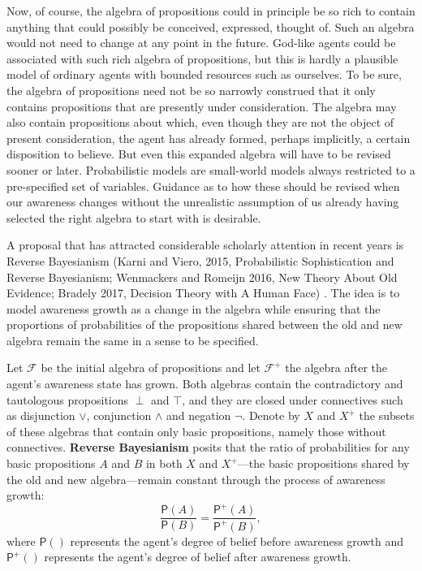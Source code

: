 \documentclass[
  11pt,
  dvipsnames,enabledeprecatedfontcommands]{scrartcl}
\newcommand{\pr}[1]{\ensuremath{\mathsf{P}(#1)}}
\newcommand{\ppr}[2]{\ensuremath{\mathsf{P}^{#1}(#2)}}
\begin{document}
Now, of course, the algebra of propositions could in principle be so
rich to contain anything that could possibly be conceived, expressed,
thought of. Such an algebra would not need to change at any point in the
future. God-like agents could be associated with such rich algebra of
propositions, but this is hardly a plausible model of ordinary agents
with bounded resources such as ourselves. To be sure, the algebra of
propositions need not be so narrowly construed that it only contains
propositions that are presently under consideration. The algebra may
also contain propositions about which, even though they are not the
object of present consideration, the agent has already formed, perhaps
implicitly, a certain disposition to believe. But even this expanded
algebra will have to be revised sooner or later. Probabilistic models
are small-world models always restricted to a pre-specified set of
variables. Guidance as to how these should be revised when our awareness
changes without the unrealistic assumption of us already having selected
the right algebra to start with is desirable.

A proposal that has attracted considerable scholarly attention in recent
years is Reverse Bayesianism (Karni and Viero, 2015, Probabilistic
Sophistication and Reverse Bayesianism; Wenmackers and Romeijn 2016, New
Theory About Old Evidence; Bradely 2017, Decision Theory with A Human
Face) . The idea is to model awareness growth as a change in the algebra
while ensuring that the proportions of probabilities of the propositions
shared between the old and new algebra remain the same in a sense to be
specified.

Let \(\mathcal{F}\) be the initial algebra of propositions and let
\(\mathcal{F}^+\) the algebra after the agent's awareness state has
grown. Both algebras contain the contradictory and tautologous
propositions \(\perp\) and \(\top\), and they are closed under
connectives such as disjunction \(\vee\), conjunction \(\wedge\) and
negation \(\neg\). Denote by \(X\) and \(X^+\) the subsets of these
algebras that contain only basic propositions, namely those without
connectives. \textbf{Reverse Bayesianism} posits that the ratio of
probabilities for any basic propositions \(A\) and \(B\) in both \(X\)
and \(X^+\)---the basic propositions shared by the old and new
algebra---remain constant through the process of awareness growth:
\[\frac{\pr{A}}{\pr{B}} = \frac{\ppr{+}{A}}{\ppr{+}{B}},\] where
\(\pr{}\) represents the agent's degree of belief before awareness
growth and \(\ppr{+}{}\) represents the agent's degree of belief after
awareness growth.
\end{document}
